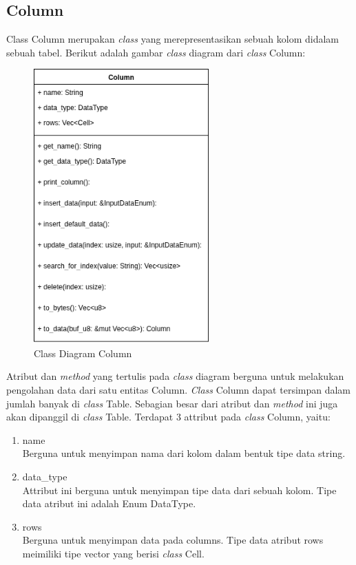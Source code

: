 \subsection{Column}
Class Column merupakan \emph{class} yang merepresentasikan sebuah kolom didalam sebuah tabel. Berikut adalah gambar \emph{class} diagram dari \emph{class} Column:
\begin{figure}[H]
  \centering{}
	\includegraphics[width=0.6\textwidth]{gambar/bab4/Column}
  \caption{Class Diagram Column}
\end{figure}

Atribut dan \emph{method} yang tertulis pada \emph{class} diagram berguna untuk melakukan pengolahan data dari satu entitas Column. \emph{Class} Column dapat tersimpan dalam jumlah banyak di \emph{class} Table. 
Sebagian besar dari atribut dan \emph{method} ini juga akan dipanggil di \emph{class} Table. Terdapat 3 attribut pada \emph{class} Column, yaitu:

\begin{enumerate}
	\item name \\
	Berguna untuk menyimpan nama dari kolom dalam bentuk tipe data string.

	\item data\_type \\
	Attribut ini berguna untuk menyimpan tipe data dari sebuah kolom. Tipe data atribut ini adalah Enum DataType.

	\item rows \\
	Berguna untuk menyimpan data pada columns. Tipe data atribut rows meimiliki tipe vector yang berisi \emph{class} Cell.
\end{enumerate}

